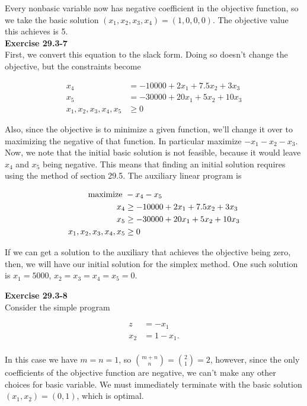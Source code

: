 \documentclass{article}
\begin{document}
Every nonbasic variable now has negative coefficient in the objective function, so we take the basic solution $(x_1,x_2,x_3,x_4) = (1,0,0,0)$. The objective value this achieves is 5. \\


\noindent\textbf{Exercise 29.3-7}\\

First, we convert this equation to the slack form. Doing so doesn't change the objective, but the constraints become

\begin{align*}
x_4 & = -10000 + 2x_1 + 7.5x_2 + 3x_3\\
x_5 & = -30000 + 20x_1 + 5x_2 + 10x_3 \\
x_1,x_2,x_3,x_4,x_5 &\ge 0
\end{align*}

Also, since the objective is to minimize a given function, we'll change it over to maximizing the negative of that function. In particular maximize $-x_1 -x_2 -x_3$. Now, we note that the initial basic solution is not feasible, because it would leave $x_4$ and $x_5$ being negative. This means that finding an initial solution requires using the method of section 29.5. The auxiliary linear program is

\begin{align*}
\hbox{maximize } &-x_4-x_5\\ 
x_4 & \ge -10000 + 2x_1 + 7.5x_2 + 3x_3\\
x_5 & \ge -30000 + 20x_1 + 5x_2 + 10x_3 \\
x_1,x_2,x_3,x_4,x_5 &\ge 0
\end{align*}

If we can get a solution to the auxiliary that achieves the objective being zero, then, we will have our initial solution for the simplex method. One such solution is $x_1 = 5000$, $x_2=x_3=x_4=x_5=0$.


\noindent\textbf{Exercise 29.3-8}\\

Consider the simple program

\begin{align*}
z &= -x_1\\
x_2 &= 1 - x_1. \\
\end{align*}

In this case we have $m = n = 1$, so ${m+n \choose n} = {2 \choose 1} = 2$, however, since the only coefficients of the objective function are negative, we can't make any other choices for basic variable.  We must immediately terminate with the basic solution $(x_1,x_2) = (0,1)$, which is optimal. \\
\end{document}

